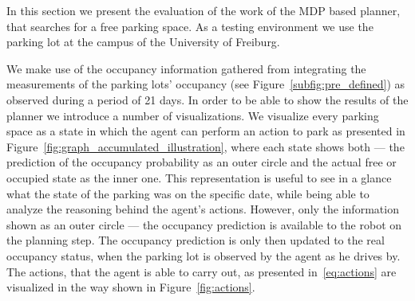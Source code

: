 In this section we present the evaluation of the work of the MDP based
planner, that searches for a free parking space. As a testing environment we
use the parking lot at the campus of the University of Freiburg.

We make use of the occupancy information gathered from integrating the
measurements of the parking lots' occupancy (see
Figure~\ref{subfig:pre_defined}) as observed during a period of 21 days. In
order to be able to show the results of the planner we introduce a number of
visualizations. We visualize every parking space as a state in which the agent
can perform an action to park as presented in
Figure~\ref{fig:graph_accumulated_illustration}, where each state shows both
--- the prediction of the occupancy probability as an outer circle and the
actual free or occupied state as the inner one. This representation is useful
to see in a glance what the state of the parking was on the specific date,
while being able to analyze the reasoning behind the agent's actions. However,
only the information shown as an outer circle --- the occupancy prediction is
available to the robot on the planning step. The occupancy prediction is only
then updated to the real occupancy status, when the parking lot is observed by
the agent as he drives by. The actions, that the agent is able to carry out,
as presented in~\eqref{eq:actions} are visualized in the way shown in
Figure~\ref{fig:actions}.

